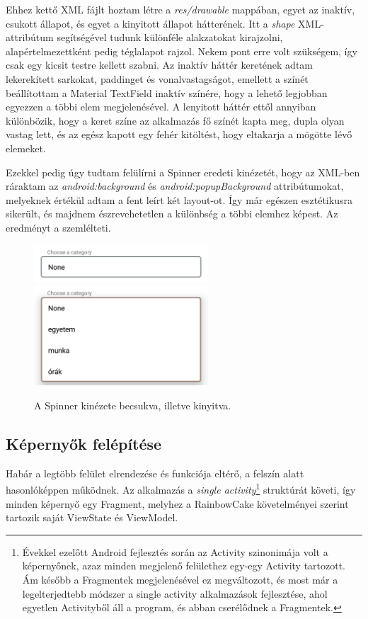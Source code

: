 Ehhez kettő XML fájlt hoztam létre a \emph{res/drawable} mappában, egyet az inaktív, csukott állapot, és egyet a kinyitott állapot hátterének. Itt a \emph{shape} XML-attribútum segítségével tudunk különféle alakzatokat kirajzolni, alapértelmezettként pedig téglalapot rajzol. Nekem pont erre volt szükségem, így csak egy kicsit testre kellett szabni. Az inaktív háttér keretének adtam lekerekített sarkokat, paddinget és vonalvastagságot, emellett a színét beállítottam a Material TextField inaktív színére, hogy a lehető legjobban egyezzen a többi elem megjelenésével. A lenyitott háttér ettől annyiban különbözik, hogy a keret színe az alkalmazás fő színét kapta meg, dupla olyan vastag lett, és az egész kapott egy fehér kitöltést, hogy eltakarja a mögötte lévő elemeket. 

Ezekkel pedig úgy tudtam felülírni a Spinner eredeti kinézetét, hogy az XML-ben ráraktam az \emph{android:background} és \emph{android:popupBackground} attribútumokat, melyeknek értékül adtam a fent leírt két layout-ot. Így már egészen esztétikusra sikerült, és majdnem észrevehetetlen a különbség a többi elemhez képest. Az eredményt a  szemlélteti.

\begin{figure}[!ht]
	\centering
	\includegraphics[width=65mm, keepaspectratio]{figures/custom_spinner_closed.png}
	\includegraphics[width=65mm, keepaspectratio]{figures/custom_spinner_open.png}
	\caption{A Spinner kinézete becsukva, illetve kinyitva.}
	\label{fig:CustomSpinner}
\end{figure}

\subsection{Képernyők felépítése}
Habár a legtöbb felület elrendezése és funkciója eltérő, a felszín alatt hasonlóképpen működnek. Az alkalmazás a \emph{single activity}\footnote{Évekkel ezelőtt Android fejlesztés során az Activity szinonimája volt a képernyőnek, azaz minden megjelenő felülethez egy-egy Activity tartozott. Ám később a Fragmentek megjelenésével ez megváltozott, és most már a legelterjedtebb módszer a single activity alkalmazások fejlesztése, ahol egyetlen Activityből áll a program, és abban cserélődnek a Fragmentek.} struktúrát követi, így minden képernyő egy Fragment, melyhez a RainbowCake követelményei szerint tartozik saját ViewState és ViewModel. 

